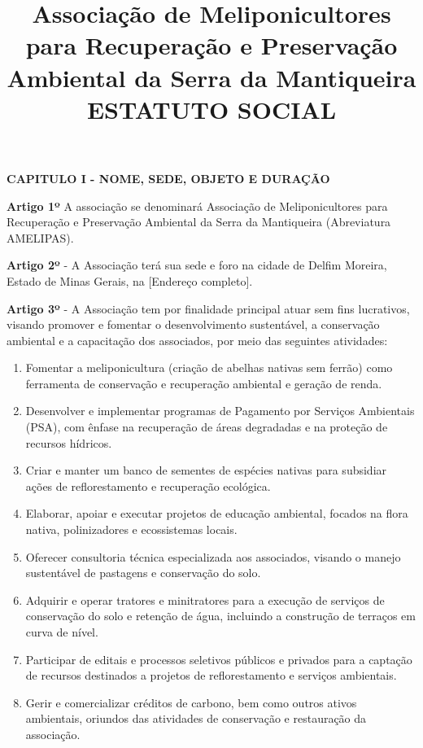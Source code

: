\documentclass[11pt]{article}
\title{Associação de Meliponicultores para Recuperação e Preservação Ambiental da Serra da Mantiqueira\\[1.0em] ESTATUTO SOCIAL}
\date{}
\newcommand{\estatutoSection}[1]{\begin{center}\textbf{\MakeUppercase{#1}}\end{center}}
\newcommand{\artigo}[1]{\vspace{1.0em}\noindent\textbf{#1}}
\begin{document}
\maketitle

\estatutoSection{Capitulo I - Nome, Sede, Objeto e Duração}

\artigo{Artigo 1º} A associação se denominará Associação de Meliponicultores para Recuperação e Preservação Ambiental da Serra da Mantiqueira (Abreviatura AMELIPAS).

\artigo{Artigo 2º} - A Associação terá sua sede e foro na cidade de Delfim Moreira, Estado de Minas Gerais, na [Endereço completo].

\artigo{Artigo 3º} - A Associação tem por finalidade principal atuar sem fins lucrativos, visando promover e fomentar o desenvolvimento sustentável, a conservação ambiental e a capacitação dos associados, por meio das seguintes atividades:

\begin{enumerate}
  \item Fomentar a meliponicultura (criação de abelhas nativas sem ferrão) como ferramenta de conservação e recuperação ambiental e geração de renda.
  \item Desenvolver e implementar programas de Pagamento por Serviços Ambientais (PSA), com ênfase na recuperação de áreas degradadas e na proteção de recursos hídricos.
  \item Criar e manter um banco de sementes de espécies nativas para subsidiar ações de reflorestamento e recuperação ecológica.
  \item Elaborar, apoiar e executar projetos de educação ambiental, focados na flora nativa, polinizadores e ecossistemas locais.
  \item Oferecer consultoria técnica especializada aos associados, visando o manejo sustentável de pastagens e conservação do solo.
  \item Adquirir e operar tratores e minitratores para a execução de serviços de conservação do solo e retenção de água, incluindo a construção de terraços em curva de nível.
  \item Participar de editais e processos seletivos públicos e privados para a captação de recursos destinados a projetos de reflorestamento e serviços ambientais.
  \item Gerir e comercializar créditos de carbono, bem como outros ativos ambientais, oriundos das atividades de conservação e restauração da associação.
\end{enumerate}
\end{document}
